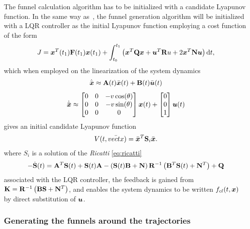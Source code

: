 The funnel calculation algorithm has to be initialized with a candidate Lyapunov
function. In the same way
as~\cite[Majumdar]{majumdarFunnelLibrariesRealtime2017}, the funnel generation
algorithm will be initialized with a \ac{LQR} controller as the initial Lyapunov
function employing a cost function of the form
\begin{equation}
  J = \boldsymbol{x}^{T} (t_1) \mathbf{F}(t_1) \boldsymbol{x} (t_1) + \int_{t_{0}}^{t_{1}} \left( \boldsymbol{x}^{T} \mathbf{Q} \boldsymbol{x} + \boldsymbol{u}^{T} \mathbf{R} u + 2 \boldsymbol{x}^T \mathbf{N} \boldsymbol{u} \right) \mathrm{d}t,
\end{equation}
which when employed on the linearization of the system dynamics
\begin{equation}
  \dot{\bar{\boldsymbol{x}}} \approx \mathbf{A} (t)\bar{\boldsymbol{x}}(t) + \mathbf{B}(t) \bar{\boldsymbol{u}}(t)
\end{equation}
\begin{equation}
  \dot{\bar{\vect{x}}} \approx %
  \begin{bmatrix}
    0 & 0 & -v\cos(\theta) \\
    0 & 0 & -v\sin(\theta) \\
    0 & 0 & 0 \\
  \end{bmatrix} %
  \vect{x} (t) %
  + %
  \begin{bmatrix}
    0 \\ 0 \\ 1
  \end{bmatrix} %
  \vect{u}(t)
\end{equation} 
gives an initial candidate Lyapunov function
\begin{equation}
  V(t,\bar{vect{x}}) = {\bar{\boldsymbol{x}}}^{T} \mathbf{S}_{i}\bar{\boldsymbol{x}}.
\end{equation}
where \(S_{i}\) is a solution of the \textit{Ricatti} \cref{eq:ricatti}
\begin{equation}
  \label{eq:ricatti}
  - \dot{\mathbf{S}}(t) = \mathbf{A}^{T} \mathbf{S}(t) +\mathbf{S}(t) \mathbf{A} - \left( \mathbf{S}(t) \mathbf{B} + \mathbf{N} \right) \mathbf{R}^{-1}\left( \mathbf{B}^{T} \mathbf{S}(t) + \mathbf{N}^{T} \right) + \mathbf{Q}
\end{equation} 
associated with the \ac{LQR} controller, the feedback is gained from \(\mathbf{K}
= \mathbf{R}^{-1}\left( \mathbf{B} \mathbf{S} + \mathbf{N}^T \right)\), and enables the
system dynamics to be written \(f_{cl}(t,\boldsymbol{x})\) by direct substitution of
\(\boldsymbol{u}\).

\subsubsection{Generating the funnels around the trajectories}
\label{subsec:generating-funnels}

